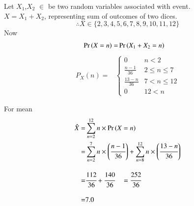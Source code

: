 Let $X_1$,$X_2$ $\in$  be two random variables associated with event.
\\ $X=X_1+X_2$, representing sum of outcomes of two dices.
$$\therefore X\in \{2,3,4,5,6,7,8,9,10,11,12\}$$
Now
\begin{align}
    \Pr\left(X=n\right) =& \Pr\left(X_1+X_2=n\right)
\end{align}   
\begin{align}
    P_X{(n)} =&
    \begin{cases}
    0 & n<2
    \\ \frac{n-1}{36} &2 \le n \le 7
    \\ \frac{13-n}{36} & 7 < n \le 12
    \\ 0 & 12 < n
    \end{cases}
    \label{pmf_equation}
\end{align}
\begin{table}[h!]
    \caption{Probability as a function of n }
    \label{tab:probability_function}
\end{table}
For mean
\begin{align}
    \hat X =& \sum_{n=2}^{12}{n\times\Pr\left(X=n\right)}
    \\=& \sum_{n=2}^{7}{n\times \left(\cfrac{n-1}{36}\right)} + \sum_{n=8}^{12}{n\times \left(\cfrac{13-n}{36}\right)}
    \\[2ex]=& \cfrac{112}{36} + \cfrac{140}{36} \quad = \cfrac{252}{36}
    \\[2ex] =& 7.0
\end{align}